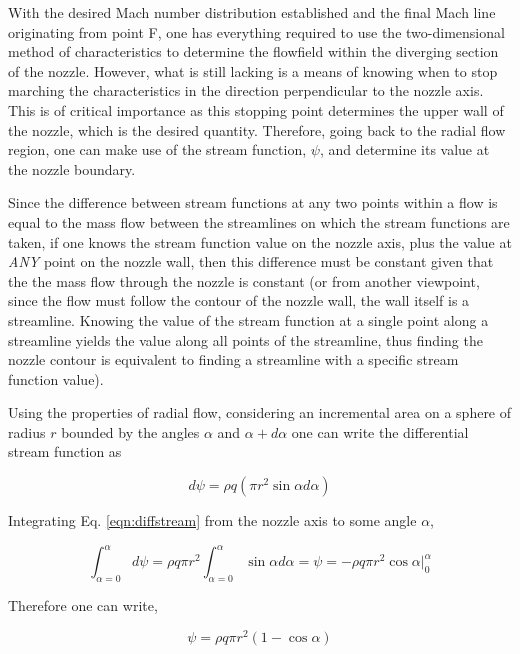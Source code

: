 	With the desired Mach number distribution established and the final Mach
line originating from point F, one has everything required to use the two-dimensional
method of characteristics to determine the flowfield within the diverging section of the nozzle.  
However, what is still 
lacking is a means of knowing when to stop marching the characteristics in the direction 
perpendicular to the nozzle axis.  This is of critical importance as this stopping point
determines the upper wall of the nozzle, which is the desired quantity.  Therefore,
going back to the radial flow region, one can make use of the stream function, $\psi$,
and determine its value at the nozzle boundary.  
	
	Since the difference between stream
functions at any two points within a flow is equal to the mass flow between the streamlines
on which the stream functions are taken, if one knows the stream function value on the
nozzle axis, plus the value at \emph{ANY} point on the nozzle wall, then this difference
must be constant given that the the mass flow through the nozzle is constant (or from another
viewpoint, since the flow must follow the contour of the nozzle wall, the wall itself is
a streamline.  Knowing the value of the stream function at a single point along a streamline yields 
the value along all points of the streamline, thus finding the nozzle contour is equivalent
to finding a streamline with a specific stream function value).

  	Using the properties of radial flow, considering an incremental area on a sphere of 
radius $r$ bounded by the angles $\alpha$ and $\alpha + d\alpha$ one can write the differential 
stream function as

\begin{equation}
	d\psi = \rho q (\pi r^2 \sin \alpha d\alpha)
\label{eqn:diffstream}
\end{equation}

	Integrating Eq. \ref{eqn:diffstream} from the nozzle axis to some angle $\alpha$,

\begin{displaymath}
	\int_{\alpha=0}^{\alpha}d\psi = \rho q \pi r^2\int_{\alpha=0}^{\alpha}\sin \alpha d\alpha = 
	\psi = -\rho q \pi r^2 \cos \alpha \vert_0^{\alpha}
\end{displaymath}

	Therefore one can write,

\begin{equation}
	\psi = \rho q \pi r^2 (1-\cos\alpha)
\label{eqn:psi}
\end{equation}	

